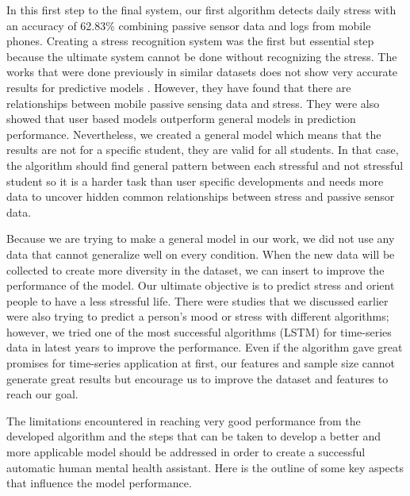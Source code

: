 \documentclass[12pt,oneandhalf,chaparabic,lfm,phd,eng,oneside,pntc]{gsufbe}
\begin{document}
In this first step to the final system, our first algorithm detects daily stress with an accuracy of 62.83\% combining passive sensor data and logs from mobile phones. Creating a stress recognition system was the first but essential step because the ultimate system cannot be done without recognizing the stress. The works that were done previously in similar datasets does not show very accurate results for predictive models \cite{wang2014studentlife, dasilva2019correlates, becker2016predict, pratap2019accuracy}. However, they have found that there are relationships between mobile passive sensing data and stress. They were also showed that user based models outperform general models in prediction performance. Nevertheless, we created a general model which means that the results are not for a specific student, they are valid for all students. In that case, the algorithm should find general pattern between each stressful and not stressful student so it is a harder task than user specific developments and needs more data to uncover hidden common relationships between stress and passive sensor data.

Because we are trying to make a general model in our work, we did not use any data that cannot generalize well on every condition. When the new data will be collected to create more diversity in the dataset, we can insert to improve the performance of the model. Our ultimate objective is to predict stress and orient people to have a less stressful life. There were studies that we discussed earlier were also trying to predict a person's mood or stress with different algorithms; however, we tried one of the most successful algorithms (LSTM) for time-series data in latest years to improve the performance. Even if the algorithm gave great promises for time-series application at first, our features and sample size cannot generate great results but encourage us to improve the dataset and features to reach our goal.

The limitations encountered in reaching very good performance from the developed algorithm and the steps that can be taken to develop a better and more applicable model should be addressed in order to create a successful automatic human mental health assistant. Here is the outline of some key aspects that influence the model performance.
\end{document}
